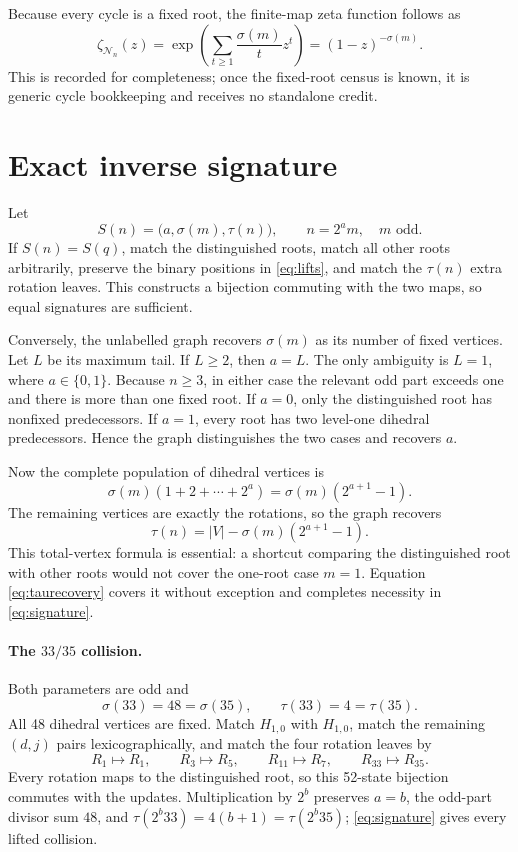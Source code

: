 \documentclass[10pt,a4paper]{amsart}
\theoremstyle{remark}
\begin{document}
Because every cycle is a fixed root, the finite-map zeta function follows as
\[
\zeta_{\mathcal N_n}(z)
=\exp\left(\sum_{t\geq1}\frac{\sigma(m)}{t}z^t\right)
=(1-z)^{-\sigma(m)}.                                   \tag{12}\label{eq:zeta}
\]
This is recorded for completeness; once the fixed-root census is known, it
is generic cycle bookkeeping and receives no standalone credit.

\section{Exact inverse signature}

Let
\[
S(n)=\bigl(a,\sigma(m),\tau(n)\bigr),\qquad n=2^am,\quad m\text{ odd}.
\]
If \(S(n)=S(q)\), match the distinguished roots, match all other roots
arbitrarily, preserve the binary positions in \eqref{eq:lifts}, and match the
\(\tau(n)\) extra rotation leaves.  This constructs a bijection commuting
with the two maps, so equal signatures are sufficient.

Conversely, the unlabelled graph recovers \(\sigma(m)\) as its number of
fixed vertices.  Let \(L\) be its maximum tail.  If \(L\geq2\), then
\(a=L\).  The only ambiguity is \(L=1\), where \(a\in\{0,1\}\).  Because
\(n\geq3\), in either case the relevant odd part exceeds one and there is
more than one fixed root.  If \(a=0\), only the distinguished root has
nonfixed predecessors.  If \(a=1\), every root has two level-one dihedral
predecessors.  Hence the graph distinguishes the two cases and recovers
\(a\).

Now the complete population of dihedral vertices is
\[
\sigma(m)(1+2+\cdots+2^a)
=\sigma(m)(2^{a+1}-1).
\]
The remaining vertices are exactly the rotations, so the graph recovers
\[
\tau(n)=|V|-\sigma(m)(2^{a+1}-1).                     \tag{13}\label{eq:taurecovery}
\]
This total-vertex formula is essential: a shortcut comparing the
distinguished root with other roots would not cover the one-root case
\(m=1\).  Equation \eqref{eq:taurecovery} covers it without exception and
completes necessity in \eqref{eq:signature}.

\paragraph{The \(33/35\) collision.}
Both parameters are odd and
\[
\sigma(33)=48=\sigma(35),\qquad \tau(33)=4=\tau(35).
\]
All 48 dihedral vertices are fixed.  Match \(H_{1,0}\) with \(H_{1,0}\),
match the remaining \((d,j)\) pairs lexicographically, and match the four
rotation leaves by
\[
R_1\mapsto R_1,\qquad R_3\mapsto R_5,\qquad
R_{11}\mapsto R_7,\qquad R_{33}\mapsto R_{35}.         \tag{14}\label{eq:collision}
\]
Every rotation maps to the distinguished root, so this 52-state bijection
commutes with the updates.  Multiplication by \(2^b\) preserves
\(a=b\), the odd-part divisor sum \(48\), and
\(\tau(2^b33)=4(b+1)=\tau(2^b35)\); \eqref{eq:signature} gives every lifted
collision.
\end{document}
